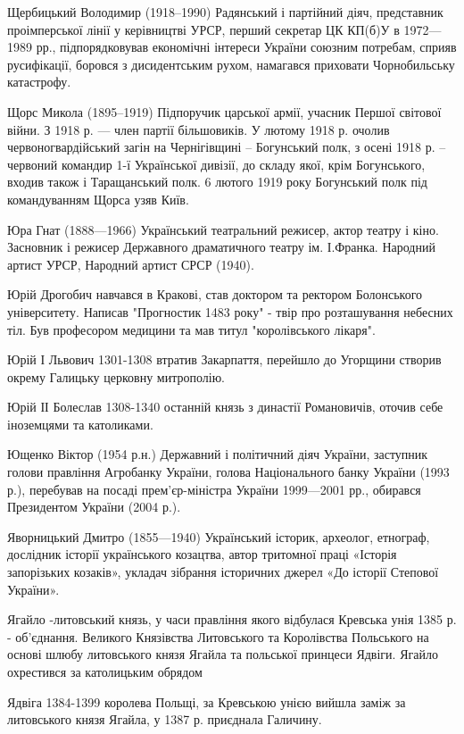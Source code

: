 Щербицький Володимир (1918–1990) Радянський і партійний діяч, представник проімперської лінії у керівництві УРСР, перший секретар ЦК КП(б)У в 1972—1989 рр., підпорядковував економічні інтереси України союзним потребам, сприяв русифікації, боровся з дисидентським рухом, намагався приховати Чорнобильську катастрофу.

Щорс Микола (1895–1919) Підпоручик царської армії, учасник Першої світової війни. З 1918 р. — член партії більшовиків. У лютому 1918 р. очолив червоногвардійський загін на Чернігівщині – Богунський полк, з осені 1918 р. – червоний командир 1-ї Української дивізії,  до складу якої, крім Богунського, входив також і Таращанський полк.  6 лютого 1919 року Богунський полк під командуванням Щорса узяв Київ.  

Юра Гнат (1888—1966) Український театральний режисер, актор театру і кіно. Засновник і режисер Державного драматичного театру ім. І.Франка. Народний артист УРСР, Народний артист СРСР (1940).

Юрій Дрогобич навчався в Кракові, став доктором та ректором Болонського університету. Написав "Прогностик 1483 року" - твір про розташування небесних тіл. Був професором медицини та мав титул "королівського лікаря".

Юрій І Львович 1301-1308 втратив Закарпаття, перейшло до Угорщини створив окрему Галицьку церковну митрополію.

Юрій ІІ Болеслав 1308-1340 останній князь з династії Романовичів, оточив себе іноземцями та католиками.

Ющенко Віктор (1954 р.н.) Державний і політичний діяч України, заступник голови правління Агробанку України, голова Національного банку України (1993 р.), перебував на посаді прем’єр-міністра України 1999—2001 рр., обирався Президентом України (2004 р.).

Яворницький Дмитро (1855—1940) Український історик, археолог, етнограф, дослідник історії українського козацтва, автор тритомної праці «Історія запорізьких козаків», укладач зібрання історичних джерел «До історії Степової України».

Ягайло -литовський князь, у часи правління якого відбулася Кревська унія 1385 р. - об’єднання. Великого Князівства Литовського та Королівства Польського на основі шлюбу литовського князя Ягайла та польської принцеси Ядвіги. Ягайло охрестився за католицьким обрядом

Ядвіга 1384-1399 королева Польщі, за Кревською унією вийшла заміж за литовського князя Ягайла, у 1387 р. приєднала Галичину.

